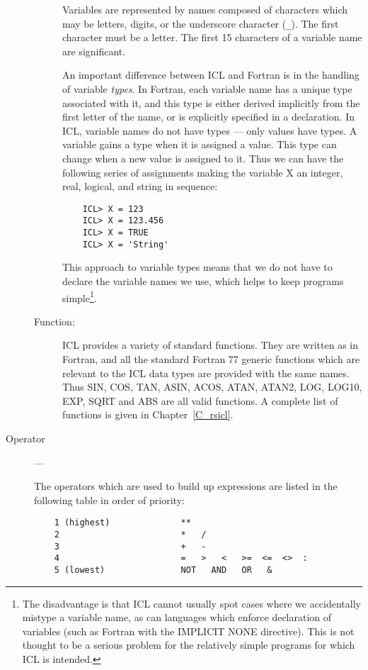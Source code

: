 \begin{description}
\begin{description}
Variables are represented by names composed of characters which may be letters,
digits, or the underscore character (\verb+_+).
The first character must be a letter.
The first 15 characters of a variable name are significant.

An important difference between ICL and Fortran is in the handling
of variable {\em types}.
In Fortran, each variable name has a unique type associated with it, and this
type is either derived implicitly from the first letter of the name, or is
explicitly specified in a declaration.
In ICL, variable names do not have types --- only values have types.
A variable gains a type when it is assigned a value.
This type can change when a new value is assigned to it.
Thus we can have the following series of assignments making the variable X
an integer, real, logical, and string in sequence:

\begin{small}
\begin{verbatim}
    ICL> X = 123      
    ICL> X = 123.456    
    ICL> X = TRUE         
    ICL> X = 'String'   
\end{verbatim}
\end{small}

This approach to variable types means that we do not have to declare the
variable names we use, which helps to keep programs simple\footnote{The
disadvantage is that ICL cannot usually spot cases where we accidentally
mistype a variable name, as can languages which enforce declaration of variables
(such as Fortran with the IMPLICIT NONE directive).
This is not thought to be a serious problem for the relatively simple programs
for which ICL is intended.}.

\item[Function:] \mbox{}

ICL provides a variety of standard functions.
They are written as in Fortran, and all the standard Fortran 77 generic
functions which are relevant to the ICL data types are provided with the same
names.
Thus SIN, COS, TAN, ASIN, ACOS, ATAN, ATAN2, LOG, LOG10, EXP, SQRT and ABS are
all valid functions.
A complete list of functions is given in Chapter~\ref{C_rsicl}.
\end{description}
\item[Operator] ---

The operators which are used to build up expressions are listed in the following
table in order of priority:

\begin{small}
\begin{verbatim}
    1 (highest)              **
    2                        *   /
    3                        +   -
    4                        =   >   <   >=  <=  <>  :
    5 (lowest)               NOT   AND   OR   &
\end{verbatim}
\end{small}


\end{description}
